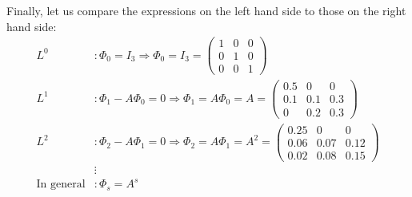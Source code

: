 \begin{enumerate}
\begin{sol}
              Finally, let us compare the expressions on the left hand side to those on the right hand side:
              \begin{align}
                  L^0
                   & : \Phi_0 = I_3
                   \Rightarrow
                   \Phi_0 = I_3
                  = \begin{pmatrix}
                        1 & 0 & 0 \\ 0 & 1 & 0 \\ 0 & 0 & 1
                    \end{pmatrix}
                    \nonumber \\
                  L^1
                   & : \Phi_1 - A \Phi_0 = 0
                   \Rightarrow
                   \Phi_1 = A \Phi_0
                  = A
                  = \begin{pmatrix}
                        0.5 & 0 & 0 \\ 0.1 & 0.1 & 0.3 \\ 0 & 0.2 & 0.3
                    \end{pmatrix}
                  \nonumber \\
                  L^2
                   & : \Phi_2 - A \Phi_1 = 0 
                   \Rightarrow
                   \Phi_2 = A \Phi_1
                  = A^2
                  = \begin{pmatrix}
                        0.25 & 0 & 0 \\ 0.06 & 0.07 & 0.12 \\ 0.02 & 0.08 & 0.15
                    \end{pmatrix}
                  \nonumber \\
                  & \vdots
                  \nonumber \\
                  \text{In general} & : \Phi_s = A^s \label{allg}
              \end{align}
          \end{sol}
\end{enumerate}